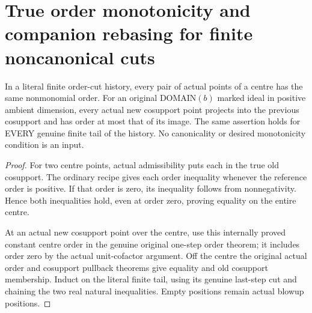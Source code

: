 \section{True order monotonicity and companion rebasing for finite noncanonical cuts}

\begin{theorem}
\label{hir:original-finite-order-cut-order-nonincreasing}
\leanok
In a literal finite order-cut history, every pair of actual points of a
centre has the same nonmonomial order. For an original DOMAIN$(b)$ marked
ideal in positive ambient dimension, every actual new cosupport point
projects into the previous cosupport and has order at most that of its
image. The same assertion holds for EVERY genuine finite tail of the
history. No canonicality or desired monotonicity condition is an input.
\end{theorem}
\begin{proof}
For two centre points, actual admissibility puts each in the true old
cosupport. The ordinary recipe gives each order inequality whenever the
reference order is positive. If that order is zero, its inequality follows
from nonnegativity. Hence both inequalities hold, even at order zero,
proving equality on the entire centre.

At an actual new cosupport point over the centre, use this internally
proved constant centre order in the genuine original one-step order
theorem; it includes order zero by the actual unit-cofactor argument.
Off the centre the original actual order and cosupport pullback theorems
give equality and old cosupport membership. Induct on the literal finite
tail, using its genuine last-step cut and chaining the two real natural
inequalities. Empty positions remain actual blowup positions.
\end{proof}

